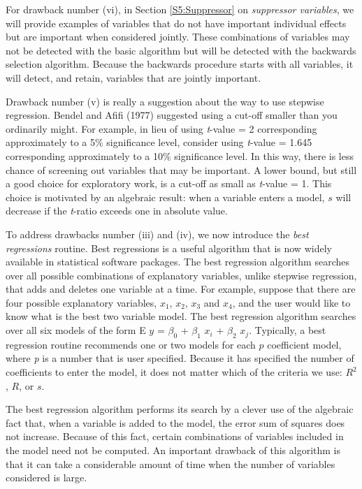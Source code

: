 For drawback number (vi), in Section \ref{S5:Suppressor} on
\textit{suppressor variables}, we will provide examples of variables
that do not have important individual effects but are important when
considered jointly. These combinations of variables may not be
detected with the basic algorithm but will be detected with the
backwards selection algorithm. Because the backwards procedure
starts with all variables, it will detect, and retain, variables
that are jointly important.

Drawback number (v) is really a suggestion about the way to use
stepwise regression. Bendel and Afifi (1977) suggested using a
cut-off smaller than you ordinarily might. For example, in lieu of
using \textit{t}-value = 2 corresponding approximately to a 5\%
significance level, consider using \textit{t}-value = 1.645
corresponding approximately to a 10\% significance level. In this
way, there is less chance of screening out variables that may be
important. A lower bound, but still a good choice for exploratory
work, is a cut-off as small as \textit{t}-value = 1. This choice is
motivated by an algebraic result: when a variable enters a model,
$s$ will decrease if the \textit{t}-ratio exceeds one in absolute
value.


To address drawbacks number (iii) and (iv), we now introduce the \textit{%
best regressions }routine. Best regressions is a useful algorithm that is
now widely available in statistical software packages. The best regression
algorithm searches over all possible combinations of explanatory variables,
unlike stepwise regression, that adds and deletes one variable at a time.
For example, suppose that there are four possible explanatory variables, $%
x_{1}$, $x_{2}$, $x_{3}$ and $x_{4}$, and the user would like to know what
is the best two variable model. The best regression algorithm searches over
all six models of the form E $y$ = $\beta _{0}$ + $\beta _{1}$ $x_{i}$ + $%
\beta _{2}$ $x_{j}$. Typically, a best regression routine recommends
one or two models for each $p$ coefficient model, where \textit{p}
is a number that is user specified. Because it has specified the
number of coefficients to enter the model, it does not matter which of the criteria we use: $R^{2}$, $%
R $, or $s$.

The best regression algorithm performs its search by a clever use of
the algebraic fact that, when a variable is added to the model, the
error sum of squares does not increase. Because of this fact,
certain combinations of variables included in the model need not be
computed. An important drawback of this algorithm is that it can
take a considerable amount of time when the number of variables
considered is large.

